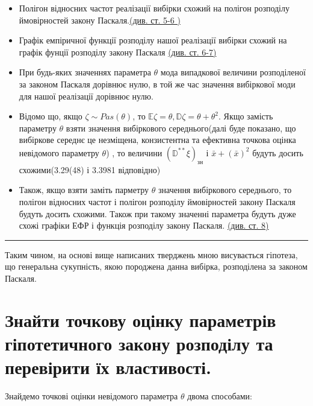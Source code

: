 \documentclass[a5paper, 20pt]{article}
\begin{document}
\begin{itemize}

\item Полігон відносних частот реалізації вибірки схожий на полігон розподілу ймовірностей закону Паскаля.\hyperlink{pol_rosp}{(див. ст. 5-6 )}

\item Графік емпіричної функції розподілу нашої реалізації вибірки схожий на графік фунції розподілу закону Паскаля \hyperlink{dfunc2}{(див. ст. 6-7)}


\item При будь-яких значеннях параметра $\theta$ мода випадкової величини розподіленої за законом Паскаля дорівнює нулю, в той же час значення вибіркової моди для нашої реалізації дорівнює нулю. 


\item Відомо що, якщо $\zeta \sim Pas\left( \theta \right)$, то $\mathbb{E} \zeta = \theta, \mathbb{D} \zeta = \theta + \theta^2$. Якщо замість параметру $\theta$ взяти значення вибіркового середнього(далі буде показано, що вибіркове середнє це незміщена, конзистентна та ефективна точкова оцінка невідомого параметру $\theta$) , то величини $\left( \mathbb{D}^{**} \xi \right)_{\text{зн}}$ і $\bar x + (\bar x)^2$  будуть досить схожими(3.29(48) і 3.3981 відповідно)

\item Також, якщо взяти заміть парметру $\theta$ значення вибіркового середнього, то полігон відносних частот і полігон розподілу ймовірностей закону Паскаля будуть досить схожими. Також при такому значенні параметра будуть дуже схожі графіки ЕФР і функція розподілу закону Паскаля. \hyperlink{link1}{(див. ст. 8)}

\end{itemize}
 


\noindent\rule{4cm}{0.4pt}

Таким чином, на основі вище написаних тверджень мною висувається гіпотеза, що генеральна сукупність, якою породжена данна вибірка, розподілена за законом Паскаля.


\newpage{}

\section{Знайти точкову оцінку параметрів гіпотетичного закону розподілу та перевірити їх властивості.}

Знайдемо точкові оцінки невідомого параметра $\theta$ двома способами:
\end{document}
